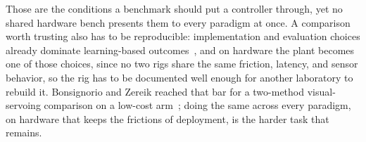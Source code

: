 Those are the conditions a benchmark should put a controller through, yet no shared hardware bench presents them to every paradigm at once.
A comparison worth trusting also has to be reproducible: implementation and evaluation choices already dominate learning-based outcomes~\cite{henderson2018deeprl,agarwal2021precipice}, and on hardware the plant becomes one of those choices, since no two rigs share the same friction, latency, and sensor behavior, so the rig has to be documented well enough for another laboratory to rebuild it.
Bonsignorio and Zereik reached that bar for a two-method visual-servoing comparison on a low-cost arm~\cite{bonsignorio2021visualservoing}; doing the same across every paradigm, on hardware that keeps the frictions of deployment, is the harder task that remains.
